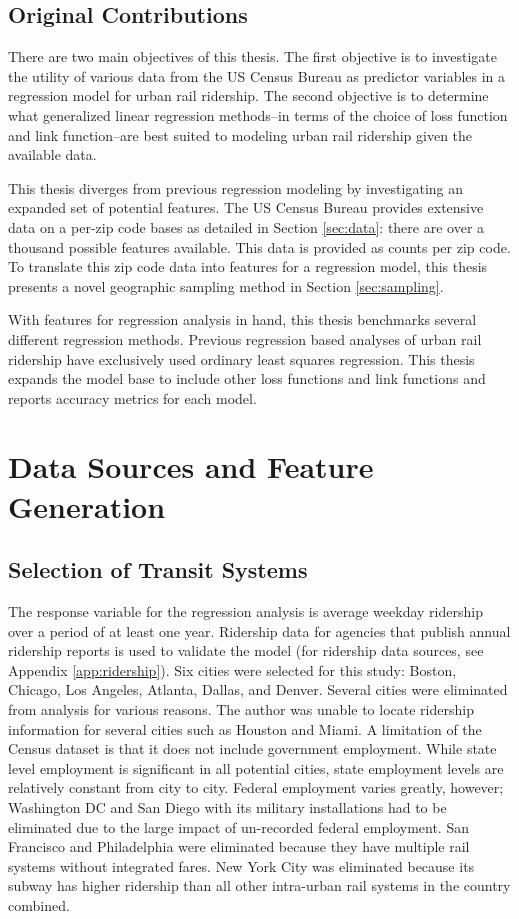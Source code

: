 \documentclass[11pt]{report}
\begin{document}
\section{Original Contributions}

There are two main objectives of this thesis. The first objective is to investigate the utility of various data from the US Census Bureau as predictor variables in a regression model for urban rail ridership. The second objective is to determine what generalized linear regression methods--in terms of the choice of loss function and link function--are best suited to modeling urban rail ridership given the available data.

This thesis diverges from previous regression modeling by investigating an expanded set of potential features. The US Census Bureau provides extensive data on a per-zip code bases as detailed in Section \ref{sec:data}: there are over a thousand possible features available. This data is provided as counts per zip code. To translate this zip code data into features for a regression model, this thesis presents a novel geographic sampling method in Section \ref{sec:sampling}. 

With features for regression analysis in hand, this thesis benchmarks several different regression methods. Previous regression based analyses of urban rail ridership have exclusively used ordinary least squares regression. This thesis expands the model base to include other loss functions and link functions and reports accuracy metrics for each model. 

\chapter{Data Sources and Feature Generation}

\section{Selection of Transit Systems}

The response variable for the regression analysis is average weekday ridership over a period of at least one year. Ridership data for agencies that publish annual ridership reports is used to validate the model (for ridership data sources, see Appendix \ref{app:ridership}). Six cities were selected for this study: Boston, Chicago, Los Angeles, Atlanta, Dallas, and Denver. Several cities were eliminated from analysis for various reasons. The author was unable to locate ridership information for several cities such as Houston and Miami. A limitation of the Census dataset is that it does not include government employment. While state level employment is significant in all potential cities, state employment levels are relatively constant from city to city. Federal employment varies greatly, however; Washington DC and San Diego with its military installations had to be eliminated due to the large impact of un-recorded federal employment. San Francisco and Philadelphia were eliminated because they have multiple rail systems without integrated fares. New York City was eliminated because its subway has higher ridership than all other intra-urban rail systems in the country combined.
\end{document}
